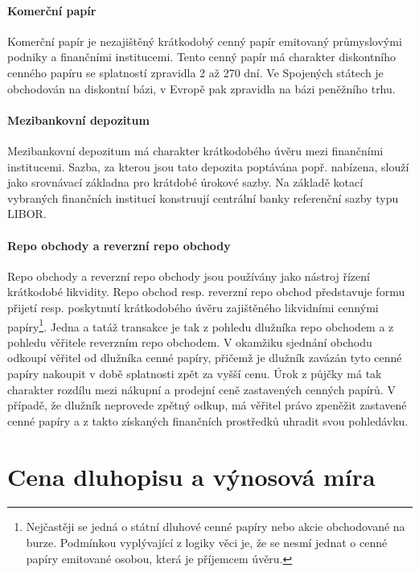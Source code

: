 \documentclass[a4paper]{book}
\begin{document}
\subsubsection{Komerční papír}

Komerční papír je nezajištěný krátkodobý cenný papír emitovaný průmyslovými podniky a finančními institucemi. Tento cenný papír má charakter diskontního cenného papíru se splatností zpravidla 2 až 270 dní. Ve Spojených státech je obchodován na diskontní bázi, v Evropě pak zpravidla na bázi peněžního trhu.

\subsubsection{Mezibankovní depozitum}

Mezibankovní depozitum má charakter krátkodobého úvěru mezi finančními institucemi. Sazba, za kterou jsou tato depozita poptávána popř. nabízena, slouží jako srovnávací základna pro krátdobé úrokové sazby. Na základě kotací vybraných finančních institucí konstruují centrální banky referenční sazby typu LIBOR.

\subsubsection{Repo obchody a reverzní repo obchody}

Repo obchody a reverzní repo obchody jsou používány jako nástroj řízení krátkodobé likvidity. Repo obchod resp. reverzní repo obchod představuje formu přijetí resp. poskytnutí krátkodobého úvěru zajištěného likvidními cennými papíry\footnote{Nejčastěji se jedná o státní dluhové cenné papíry nebo akcie obchodované na burze. Podmínkou vyplývající z logiky věci je, že se nesmí jednat o cenné papíry emitované osobou, která je příjemcem úvěru.}. Jedna a tatáž transakce je tak z pohledu dlužníka repo obchodem a z pohledu věřitele reverzním repo obchodem. V okamžiku sjednání obchodu odkoupí věřitel od dlužníka cenné papíry, přičemž je dlužník zavázán tyto cenné papíry nakoupit v době splatnosti zpět za vyšší cenu. Úrok z půjčky má tak charakter rozdílu mezi nákupní a prodejní ceně zastavených cenných papírů. V případě, že dlužník neprovede zpětný odkup, má věřitel právo zpeněžit zastavené cenné papíry a z takto získaných finančních prostředků uhradit svou pohledávku.

\chapter{Cena dluhopisu a výnosová míra}
\end{document}
